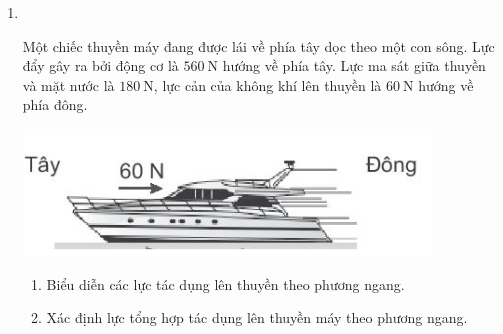 \begin{enumerate}[label=\bfseries Bài \arabic*:]
\item {}\\
{Một chiếc thuyền máy đang được lái về phía tây dọc theo một con sông. Lực đẩy gây ra bởi động cơ là $\SI{560}{\newton}$ hướng về phía tây. Lực ma sát giữa thuyền và mặt nước là $\SI{180}{\newton}$, lực cản của không khí lên thuyền là $\SI{60}{\newton}$ hướng về phía đông.
	\begin{center}
		\includegraphics[width=0.4\linewidth]{../figs/VN10-2022-PH-TP020-P-3}
	\end{center}
\begin{enumerate}[label=\alph*)]
	\item Biểu diễn các lực tác dụng lên thuyền theo phương ngang.
	\item Xác định lực tổng hợp tác dụng lên thuyền máy theo phương ngang.
\end{enumerate}
}


\end{enumerate}
